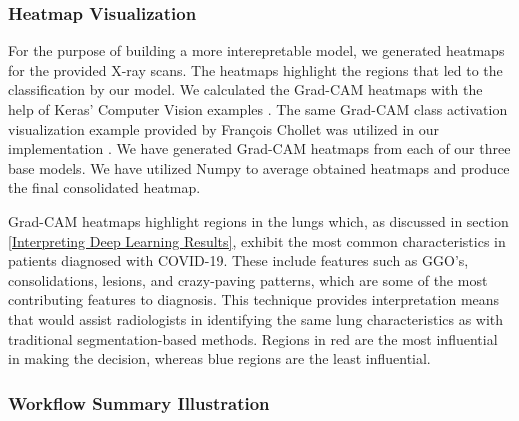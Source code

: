 \subsubsection{Heatmap Visualization}

For the purpose of building a more interepretable model, we generated heatmaps for the provided X-ray scans. The heatmaps highlight the regions that led to the classification by our model. We calculated the Grad-CAM heatmaps with the help of Keras' Computer Vision examples \cite{KCV}. The same Grad-CAM class activation visualization example provided by François Chollet was utilized in our implementation \cite{KGM}. We have generated Grad-CAM heatmaps from each of our three base models. We have utilized Numpy \cite{NUM} to average obtained heatmaps and produce the final consolidated heatmap.

Grad-CAM heatmaps highlight regions in the lungs which, as discussed in section \ref{Interpreting Deep Learning Results}, exhibit the most common characteristics in patients diagnosed with COVID-19. These include features such as GGO’s, consolidations, lesions, and crazy-paving patterns, which are some of the most contributing features to diagnosis. This technique provides interpretation means that would assist radiologists in identifying the same lung characteristics as with traditional segmentation-based methods. Regions in red are the most influential in making the decision, whereas blue regions are the least influential.


\subsubsection{Workflow Summary Illustration}

